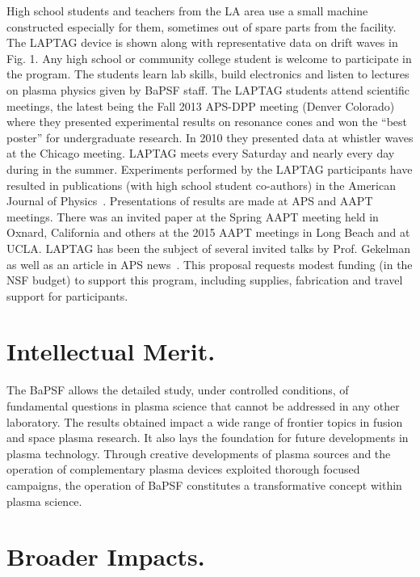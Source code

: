 \documentclass[11pt]{article}
\renewcommand{\cite}{\citep}
\begin{document}
High school students and teachers from the LA area use a small machine
constructed especially for them, sometimes out of spare parts from
the facility.  The LAPTAG device is shown along with representative
data on drift waves in Fig. 1.  Any high school or community college
student is welcome to participate in the program.  The students learn
lab skills, build electronics and listen to lectures on plasma physics
given by BaPSF staff. The LAPTAG students attend scientific meetings,
the latest being the Fall 2013 APS-DPP meeting (Denver Colorado) where
they presented experimental results on resonance cones and won the
``best poster'' for undergraduate research.  In 2010 they presented
data at whistler waves at the Chicago meeting.  LAPTAG meets every
Saturday and nearly every day during in the summer. Experiments
performed by the LAPTAG participants have resulted in publications
(with high school student co-authors) in the American Journal of
Physics~\cite{gekelman:2007,gekelman:2011}.  Presentations of results
are made at APS and AAPT meetings. There was an invited paper at the
Spring AAPT meeting held in Oxnard, California and others at the 2015
AAPT meetings in Long Beach and at UCLA.  LAPTAG has been the subject
of several invited talks by Prof. Gekelman as well as an article in
APS news~\cite{gekelman2002laptag}.  This proposal requests modest
funding (in the NSF budget) to support this program, including
supplies, fabrication and travel support for participants.

\section{Intellectual Merit.}

The BaPSF allows the detailed study, under controlled conditions, of
fundamental questions in plasma science that cannot be addressed in any
other laboratory. The results obtained impact a wide range of frontier
topics in fusion and space plasma research. It also lays the foundation
for future developments in plasma technology. Through creative
developments of plasma sources and the operation of complementary plasma
devices exploited thorough focused campaigns, the operation of BaPSF
constitutes a transformative concept within plasma science.

\section{Broader Impacts.}
\end{document}
